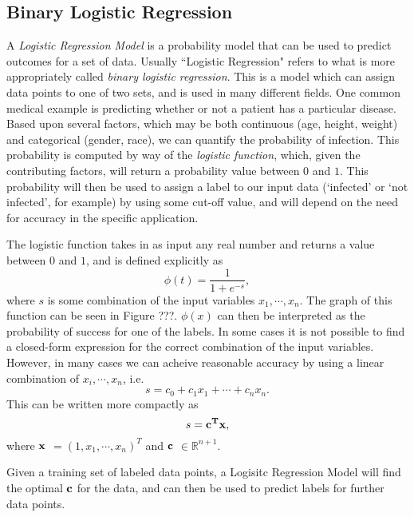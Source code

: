 
\subsection*{Binary Logistic Regression}
A \emph{Logistic Regression Model} is a probability model that can be used to predict outcomes for a set of data.  Usually ``Logistic Regression" refers to what is more appropriately called \emph{binary logistic regression}.  This is a model which can assign data points to one of two sets, and is used in many different fields.  One common medical example is predicting whether or not a patient has a particular disease.  Based upon several factors, which may be both continuous (age, height, weight) and categorical (gender, race), we can quantify the probability of infection.  This probability is computed by way of the \emph{logistic function}, which, given the contributing factors, will return a probability value between $0$ and $1$.  This probability will then be used to assign a label to our input data (`infected' or `not infected', for example) by using some cut-off value, and will depend on the need for accuracy in the specific application.

The logistic function takes in as input any real number and returns a value between $0$ and $1$, and is defined explicitly as
\begin{equation}
\phi(t) = \frac{1}{1 + e^{-s}},
\end{equation}
where $s$ is some combination of the input variables $x_1, \cdots, x_n$.  The graph of this function can be seen in Figure ???.   $\phi(x)$ can then be interpreted as the probability of success for one of the labels.  In some cases it is not possible to find a closed-form expression for the correct combination of the input variables.  However, in many cases we can acheive reasonable accuracy by using a linear combination of $x_i, \cdots, x_n$, i.e.
\begin{equation*}
s = c_0 + c_1 x_1 + \cdots + c_n x_n.
\end{equation*}
This can be written more compactly as
\begin{equation*}
s = \bf{c}^{T}\bf{x},
\end{equation*}
where $\bf{x}$ $= (1, x_1, \cdots , x_n)^{T}$ and $\bf{c}$ $\in \mathbb{R}^{n+1}$.

Given a training set of labeled data points, a Logisitc Regression Model will find the optimal $\bf{c}$ for the data, and can then be used to predict labels for further data points.

